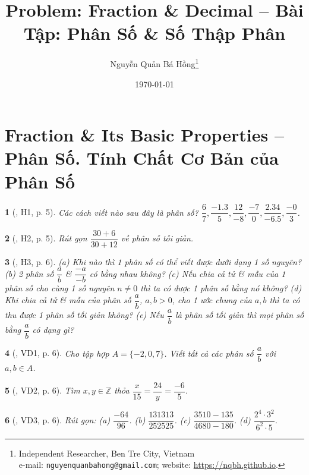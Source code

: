 \documentclass{article}
\title{Problem: Fraction \& Decimal -- Bài Tập: Phân Số \& Số Thập Phân}
\author{Nguyễn Quản Bá Hồng\footnote{Independent Researcher, Ben Tre City, Vietnam\\e-mail: \texttt{nguyenquanbahong@gmail.com}; website: \url{https://nqbh.github.io}.}}
\date{\today}
\newtheorem{baitoan}{}
\begin{document}
\maketitle
\tableofcontents


\section{Fraction \& Its Basic Properties -- Phân Số. Tính Chất Cơ Bản của Phân Số}

\begin{baitoan}[\cite{Binh_boi_duong_Toan_6_tap_2}, H1, p. 5]
	Các cách viết nào sau đây là phân số? $\dfrac{6}{7},\dfrac{-1.3}{5},\dfrac{12}{-8},\dfrac{-7}{0},\dfrac{2.34}{-6.5},\dfrac{-0}{3}$.
\end{baitoan}

\begin{baitoan}[\cite{Binh_boi_duong_Toan_6_tap_2}, H2, p. 5]
	Rút gọn $\dfrac{30 + 6}{30 + 12}$ về phân số tối giản.
\end{baitoan}

\begin{baitoan}[\cite{Binh_boi_duong_Toan_6_tap_2}, H3, p. 6]
	(a) Khi nào thì 1 phân số có thể viết được dưới dạng 1 số nguyên? (b) 2 phân số $\dfrac{a}{b}$ \& $\dfrac{-a}{-b}$ có bằng nhau không? (c) Nếu chia cả tử \& mẫu của 1 phân số cho cùng 1 số nguyên $n\ne0$ thì ta có được 1 phân số bằng nó không? (d) Khi chia cả tử \& mẫu của phân số $\dfrac{a}{b}$, $a,b > 0$, cho 1 ước chung của $a,b$ thì ta có thu được 1 phân số tối giản không? (e) Nếu $\dfrac{a}{b}$ là phân số tối giản thì mọi phân số bằng $\dfrac{a}{b}$ có dạng gì?
\end{baitoan}

\begin{baitoan}[\cite{Binh_boi_duong_Toan_6_tap_2}, VD1, p. 6]
	Cho tập hợp $A = \{-2,0,7\}$. Viết tất cả các phân số $\dfrac{a}{b}$ với $a,b\in A$.
\end{baitoan}

\begin{baitoan}[\cite{Binh_boi_duong_Toan_6_tap_2}, VD2, p. 6]
	Tìm $x,y\in\mathbb{Z}$ thỏa $\dfrac{x}{15} = \dfrac{24}{y} = \dfrac{-6}{5}$.
\end{baitoan}

\begin{baitoan}[\cite{Binh_boi_duong_Toan_6_tap_2}, VD3, p. 6]
	Rút gọn: (a) $\dfrac{-64}{96}$. (b) $\dfrac{131313}{252525}$. (c) $\dfrac{3510 - 135}{4680 - 180}$. (d) $\dfrac{2^4\cdot3^2}{6^2\cdot5}$.
\end{baitoan}
\end{document}
